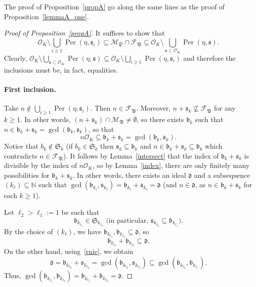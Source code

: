 \documentclass[leqno,a4paper,12pt]{article}
\theoremstyle{definition}
\newcommand{\Per}{\operatorname{Per}\nolimits}
\newcommand{\N}{{\mathbb{N}}}
\newcommand{\OK}{\mathcal{O}_K}
\begin{document}
The proof of Proposition~\ref{propA} go along the same lines as the proof of Proposition~\ref{lemmaA_one}.



\begin{proof}[Proof of Proposition~\ref{propA}] %
It suffices to show that
\begin{equation}\label{dwie_inkluzje_ok}
\OK\setminus\bigcup_{i\geq1}\Per(\eta,\mathfrak{s}_i)\subseteq\mathcal{M}_{\mathfrak{D}}\cap \mathcal{F}_{\mathfrak{B}}\subseteq\OK\setminus \bigcup_{\mathfrak{s}\subset \OK}\Per(\eta,\mathfrak{s}).
\end{equation}
Clearly, $\OK\setminus \bigcup_{\mathfrak{s}\subset\OK}\Per(\eta,\mathfrak{s})\subseteq \OK\setminus \bigcup_{i\geq 1}\Per(\eta,\mathfrak{s}_i)$ and therefore the inclusions must be, in fact, equalities.

\paragraph{First inclusion.} Take $n\not\in \bigcup_{i\geq 1}\Per(\eta,\mathfrak{s}_i)$. Then $n\in\mathcal{F}_\mathfrak{B}$. Moreover, $n+\mathfrak{s}_k\not\subseteq \mathcal{F}_\mathfrak{B}$ for any $k\geq 1$. In other words, $(n+\mathfrak{s}_k)\cap\mathcal{M}_\mathfrak{B}\neq\emptyset$, so there exists $\mathfrak{b}_k$ such that $n\in \mathfrak{b}_k+\mathfrak{s}_k=\gcd(\mathfrak{b}_k,\mathfrak{s}_k)$, so that
\[
n\OK \subseteq \mathfrak{b}_k+\mathfrak{s}_k=\gcd(\mathfrak{b}_k,\mathfrak{s}_k).
\]
Notice that $b_k\not\in\mathfrak{S}_k$ (if $b_k\in\mathfrak{S}_k$ then $\mathfrak{s}_k\subseteq\mathfrak{b}_k$ and $n\in\mathfrak{b}_k+\mathfrak{s}_k\subseteq \mathfrak{b}_k$ which contradicts $n\in\mathcal{F}_\mathfrak{B}$). It follows by Lemma~\ref{intersect} that the index of $\mathfrak{b}_k+\mathfrak{s}_k$ is divisible by the index of $n\OK$, so by Lemma~\ref{index},  there are only finitely many possibilities for $\mathfrak{b}_k+\mathfrak{s}_k$. In other words, there exists an ideal $\mathfrak{d}$ and a subsequence $(k_\ell)\subseteq\N$ such that $\gcd(\mathfrak{b}_{k_\ell},\mathfrak{s}_{k_\ell})=\mathfrak{b}_{k_\ell}+\mathfrak{s}_{k_\ell}=\mathfrak{d}$ (and $n\in\mathfrak{d}$, as $n\in \mathfrak{b}_k+\mathfrak{s}_k$ for each $k\geq 1$).

Let $\ell_2>\ell_1:=1$ be such that
\begin{equation}\label{rnie}
\mathfrak{b}_{k_{\ell_1}}\in\mathfrak{S}_{k_{\ell_2}} \text{ (in particular, $\mathfrak{s}_{k_{\ell_2}}\subseteq \mathfrak{b}_{k_{\ell_1}}$).}
\end{equation}
By the choice of $(k_\ell)$, we have $\mathfrak{b}_{k_{\ell_1}},\mathfrak{b}_{k_{\ell_2}}\subseteq \mathfrak{d}$, so
\[
\mathfrak{b}_{k_{\ell_1}}+\mathfrak{b}_{k_{\ell_2}}\subseteq \mathfrak{d}.
\]
On the other hand, using~\eqref{rnie},  we obtain
\[
\mathfrak{d}=\mathfrak{b}_{k_{\ell_2}}+\mathfrak{s}_{k_{\ell_2}}=\gcd(\mathfrak{b}_{k_{\ell_2}},\mathfrak{s}_{k_{\ell_2}})\subseteq\gcd(\mathfrak{b}_{k_{\ell_2}},\mathfrak{b}_{k_{\ell_1}}).
\]
Thus, $\gcd(\mathfrak{b}_{k_{\ell_1}},\mathfrak{b}_{k_{\ell_2}})=\mathfrak{b}_{k_{\ell_1}}+\mathfrak{b}_{k_{\ell_2}}=\mathfrak{d}$.


\end{proof}
\end{document}
